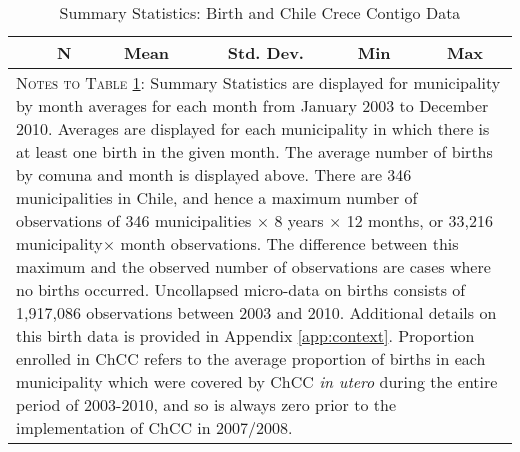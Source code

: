 \documentclass[12pt]{article}
\begin{document}
\begin{spacing}{1.4}
\begin{table}[htpb!]
  \begin{center}
    \caption{Summary Statistics: Birth and Chile Crece Contigo Data}
    \label{tab:sumstats}
    \begin{tabular}{lccccc} \toprule
      & N& Mean & Std. Dev. & Min & Max \\ \midrule
       \bottomrule
      \multicolumn{6}{p{15.2cm}}{{\footnotesize \textsc{Notes to Table
            \ref{tab:sumstats}}: Summary Statistics are displayed for
          municipality by month averages for
          each month from January 2003 to December 2010.  Averages are
          displayed for each municipality in which there is at least one
          birth in the given month.  The average number of births by
          comuna and month is displayed above.  There are 346 municipalities
          in Chile, and hence a maximum number of observations of 346
          municipalities $\times$ 8 years $\times$ 12 months, or 33,216
          municipality$\times$ month observations.  The difference between
          this maximum and the observed number of observations are cases
          where no births occurred.  Uncollapsed micro-data on births
          consists of 1,917,086 observations between 2003 and 2010.
          Additional details on this birth data is provided in
          Appendix \ref{app:context}.  Proportion enrolled in ChCC
          refers to the average proportion of births in each municipality
          which were covered by ChCC \emph{in utero} during the entire
          period of 2003-2010, and so is always zero prior to the implementation
          of ChCC in 2007/2008.
      }}
      \end{tabular}
  \end{center}
\end{table}

\begin{landscape}

\end{landscape}


\end{spacing}
\end{document}
